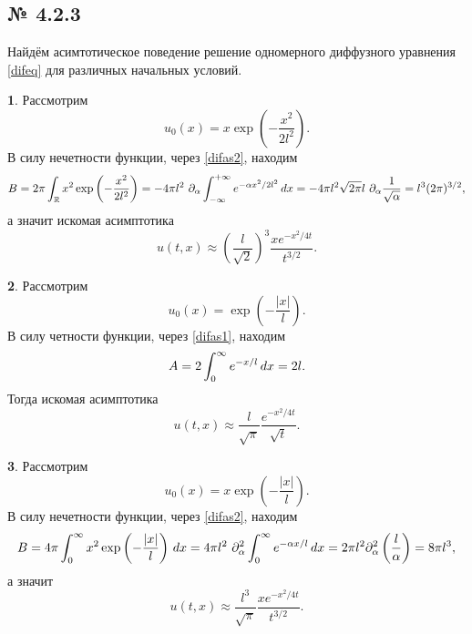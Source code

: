 \subsection*{№ 4.2.3}

Найдём асимтотическое поведение решение одномерного диффузного уравнения \eqref{difeq} для различных начальных условий.

\textbf{1}. Рассмотрим
\begin{equation*}
    u_0 (x) = x \exp\left(- \frac{x^2}{2l^2}\right).
\end{equation*}
В силу нечетности функции, через \eqref{difas2}, находим
\begin{equation*}
    B = 2 \pi \int_{ \mathbb{R}} x^2 \exp\left(- \frac{x^2}{2l^2}\right) =
    -4 \pi l^2 \ \partial_\alpha \int_{-\infty}^{+\infty} e^{- \alpha x^2 / 2 l^2} \, d x = 
    -4 \pi l^2 \sqrt{2 \pi} l  \ \partial_\alpha \frac{1}{\sqrt{\alpha}} = l^3  (2\pi)^{3/2},
\end{equation*}
а значит искомая асимптотика
\begin{equation*}
    u(t, x) \approx \left(\frac{l}{\sqrt{2}}\right)^3  \frac{x e^{-{x^2}/{4 t}}}{t^{3/2}}.
\end{equation*}

\textbf{2}. Рассмотрим
\begin{equation*}
    u_0 (x) = \exp\left(- \frac{|x|}{l}\right).
\end{equation*}
В силу четности функции, через \eqref{difas1}, находим
\begin{equation*}
    A = 2 \int_{0}^{\infty} e^{-x/l} \, d x = 2 l.
\end{equation*}
Тогда искомая асимптотика
\begin{equation*}
    u(t, x) \approx \frac{l}{\sqrt{\pi}} \frac{e^{-x^2 / 4 t}}{\sqrt{t}}.
\end{equation*}

\textbf{3}. Рассмотрим
\begin{equation*}
    u_0 (x) = x \exp\left(- \frac{|x|}{l}\right).
\end{equation*}
В силу нечетности функции, через \eqref{difas2}, находим
\begin{equation*}
    B = 4 \pi \int_0^\infty x^2 \exp\left(- \frac{|x|}{l}\right) \, d x = 4 \pi l^2 \ \partial_\alpha^2 \int_{0}^{\infty} e^{- \alpha x / l} \, d x = 2 \pi l^2 \partial_\alpha^2 \left(\frac{l}{\alpha}\right) = 8 \pi l^3,
\end{equation*}
а значит
\begin{equation*}
    u(t, x) \approx \frac{l^3}{\sqrt{\pi}}\frac{x e^{-{x^2}/{4 t}}}{t^{3/2}}.
\end{equation*}


